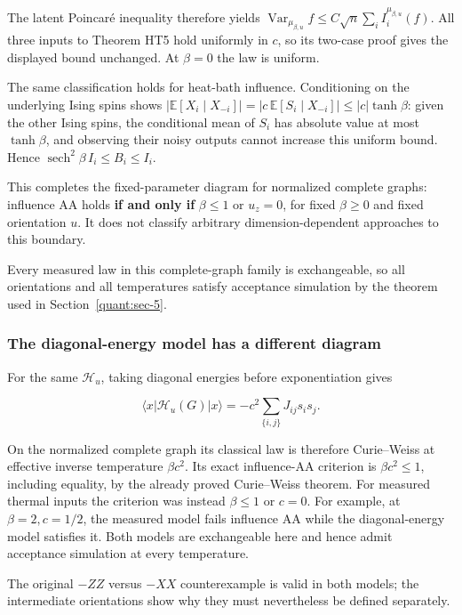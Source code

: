 The latent Poincaré inequality therefore yields
\(\operatorname{Var}_{\mu_{\beta,u}}f\le C\sqrt n\sum_i I_i^{\mu_{\beta,u}}(f)\).
All three inputs to Theorem HT5 hold uniformly in \(c\), so its two-case
proof gives the displayed bound unchanged. At \(\beta=0\) the law is
uniform.

The same classification holds for heat-bath influence. Conditioning on
the underlying Ising spins shows \(|\mathbb E[X_i\mid X_{-i}]|
=|c\,\mathbb E[S_i\mid X_{-i}]|\le |c|\tanh\beta\): given the other
Ising spins, the conditional mean of \(S_i\) has absolute value at most
\(\tanh\beta\), and observing their noisy outputs cannot increase this
uniform bound. Hence \(\operatorname{sech}^2\beta\,I_i\le B_i\le I_i\).

This completes the fixed-parameter diagram for normalized complete
graphs: influence AA holds \textbf{if and only if} \(\beta\le1\) or
\(u_z=0\), for fixed \(\beta\ge0\) and fixed orientation \(u\). It does
not classify arbitrary dimension-dependent approaches to this boundary.

Every measured law in this complete-graph family is exchangeable, so all
orientations and all temperatures satisfy acceptance simulation by the
theorem used in Section~\ref{quant:sec-5}.

\subsubsection{The diagonal-energy model has a different
diagram}\label{quant:heading-6}

For the same \(\mathcal H_u\), taking diagonal energies before
exponentiation gives

\[
\langle x|\mathcal H_u(G)|x\rangle
=-c^2\sum_{\{i,j\}}J_{ij}s_is_j.
\]

On the normalized complete graph its classical law is therefore
Curie--Weiss at effective inverse temperature \(\beta c^2\). Its exact
influence-AA criterion is \textbf{\(\beta c^2\le1\)}, including
equality, by the already proved Curie--Weiss theorem. For measured
thermal inputs the criterion was instead \(\beta\le1\) or \(c=0\). For
example, at \(\beta=2,c=1/2\), the measured model fails influence AA
while the diagonal-energy model satisfies it. Both models are
exchangeable here and hence admit acceptance simulation at every
temperature.

The original \(-ZZ\) versus \(-XX\) counterexample is valid in both
models; the intermediate orientations show why they must nevertheless be
defined separately.

